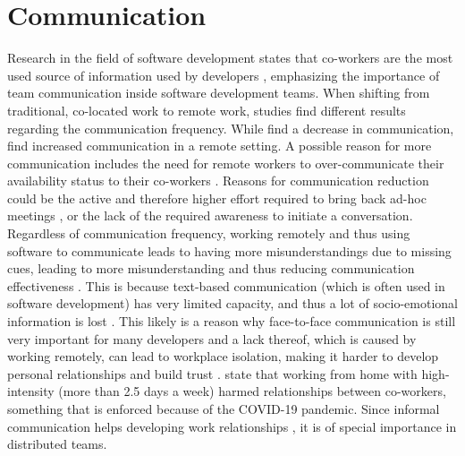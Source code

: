 \section{Communication}
Research in the field of software development states that co-workers are the most used source of information used by developers \autocite{ko2007information}, emphasizing the importance of team communication inside software development teams. When shifting from traditional, co-located work to remote work, studies find different results regarding the communication frequency. While \textcite{kraut1988patterns, allen1984managing} find a decrease in communication, \textcite{mulki2009set} find increased communication in a remote setting. A possible reason for more communication includes the need for remote workers to over-communicate their availability status to their co-workers \autocite{koehne2012remote}. Reasons for communication reduction could be the active and therefore higher effort required to bring back ad-hoc meetings \autocite{miller2021your}, or the lack of the required awareness to initiate a conversation. Regardless of communication frequency, working remotely and thus using software to communicate leads to having more misunderstandings due to missing cues, leading to more misunderstanding and thus reducing communication effectiveness \autocite{mulki2009set}. This is because text-based communication (which is often used in software development) has very limited capacity, and thus a lot of socio-emotional information is lost \autocite{hassib2017heartchat}. This likely is a reason why face-to-face communication is still very important for many developers \autocite{storey2016social} and a lack thereof, which is caused by working remotely, can lead to workplace isolation, making it harder to develop personal relationships and build trust \autocite{mulki2009set}. \textcite{gajendran2007good} state that working from home with high-intensity (more than 2.5 days a week) harmed relationships between co-workers, something that is enforced because of the COVID-19 pandemic. Since informal communication helps developing work relationships \autocite{comella2020revisiting, olson2006bridging}, it is of special importance in distributed teams.



